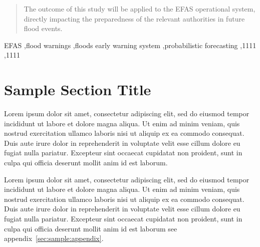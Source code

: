 \documentclass[preprint,12pt]{elsarticle}
\begin{document}
\begin{frontmatter}
\begin{abstract}
The outcome of this study will be applied to the EFAS operational system, directly impacting the preparedness of the relevant authorities in future flood events.
\end{abstract}



\begin{keyword}
EFAS \sep flood warnings \sep floods early warning system \sep probabilistic forecasting
 \sep 1111
 \sep 1111
\end{keyword}

\end{frontmatter}


\section{Sample Section Title}
\label{sec:sample1}


Lorem ipsum dolor sit amet, consectetur adipiscing \citep{Fabioetal2013} elit, sed do eiusmod tempor incididunt ut labore et dolore magna \citet{Blondeletal2008} aliqua. Ut enim ad minim veniam, quis nostrud exercitation ullamco laboris nisi ut aliquip ex ea commodo consequat. Duis aute irure dolor in reprehenderit in voluptate velit esse cillum dolore eu fugiat nulla pariatur. Excepteur sint occaecat cupidatat non proident, sunt in culpa qui officia deserunt mollit \citep{Blondeletal2008,FabricioLiang2013} anim id est laborum.

Lorem ipsum dolor sit amet, consectetur adipiscing elit, sed do eiusmod tempor incididunt ut labore et dolore magna aliqua. Ut enim ad minim veniam, quis nostrud exercitation ullamco laboris nisi ut aliquip ex ea commodo consequat. Duis aute irure dolor in reprehenderit in voluptate velit esse cillum dolore eu fugiat nulla pariatur. Excepteur sint occaecat cupidatat non proident, sunt in culpa qui officia deserunt mollit anim id est laborum see appendix~\ref{sec:sample:appendix}.
\end{document}
